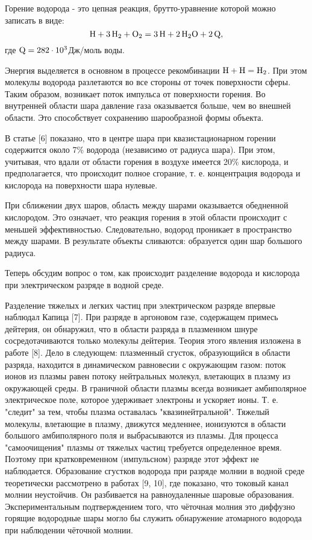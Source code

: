 \documentclass[a4paper]{article}
\begin{document}
\newpage
Горение водорода - это цепная реакция, брутто-уравнение которой можно записать в виде:
\begin{equation} \label{eq:1}
\ce{H} + \ce{3H2} + \ce{O2} = \ce{3H} + \ce{2H2O} + \ce{2Q},    
\end{equation}
где \(\ce{Q} = 282\cdot10^3\)Дж/моль воды.

Энергия выделяется в основном в процессе рекомбинации \(\ce{H} + \ce{H} = \ce{H2}\). При этом молекулы водорода разлетаются во все стороны от точек поверхности сферы. Таким образом, возникает поток импульса от поверхности горения. Во внутренней области шара давление газа оказывается больше, чем во внешней области. Это способствует сохранению шарообразной формы объекта. 

В статье [6] показано, что в центре шара при квазистационарном горении содержится около 7\% водорода (независимо от радиуса шара). При этом, учитывая, что вдали от области горения в воздухе имеется 20\% кислорода, и предполагается, что происходит полное сгорание, т. е. концентрация водорода и кислорода на поверхности шара нулевые.

При сближении двух шаров, область между шарами оказывается обедненной кислородом. Это означает, что реакция горения в этой области происходит с меньшей эффективностью. Следовательно, водород проникает в пространство между шарами. В результате объекты сливаются: образуется один шар большого радиуса.


Теперь обсудим вопрос о том, как происходит разделение водорода и кислорода при электрическом разряде в водной среде.

Разделение тяжелых и легких частиц при электрическом разряде впервые наблюдал Капица [7]. При разряде в аргоновом газе, содержащем примесь дейтерия, он обнаружил, что в области разряда в плазменном шнуре сосредотачиваются только молекулы дейтерия. Теория этого явления изложена в работе [8]. Дело в следующем: плазменный сгусток, образующийся в области разряда, находится в динамическом равновесии с окружающим газом: поток ионов из плазмы равен потоку нейтральных молекул, влетающих в плазму из окружающей среды. В граничной области плазмы всегда возникает амбиполярное электрическое поле, которое удерживает электроны и ускоряет ионы. Т. е. "следит" за тем, чтобы плазма оставалась "квазинейтральной". Тяжелый молекулы, влетающие в плазму, движутся медленнее, ионизуются в области большого амбиполярного поля и выбрасываются из плазмы. Для процесса "самоочищения" плазмы от тяжелых частиц требуется определенное время. Поэтому при кратковременном (импульсном) разряде этот эффект не наблюдается. Образование сгустков водорода при разряде молнии в водной среде теоретически рассмотрено в работах [9, 10], где показано, что токовый канал молнии неустойчив. Он разбивается на равноудаленные шаровые образования. Экспериментальным подтверждением того, что чёточная молния это диффузно горящие водородные шары могло бы служить обнаружение атомарного водорода при наблюдении чёточной молнии.
\end{document}
